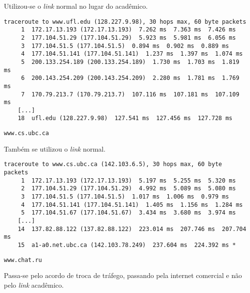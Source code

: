 \begin{parts}
\begin{subparts}
    \begin{solution}
      Utilizou-se o \emph{link} normal no lugar do acadêmico.

    \begin{Verbatim}[label={\$ traceroute www.ufl.edu}, fontsize=\footnotesize]
    traceroute to www.ufl.edu (128.227.9.98), 30 hops max, 60 byte packets
     1  172.17.13.193 (172.17.13.193)  7.262 ms  7.363 ms  7.426 ms
     2  177.104.51.29 (177.104.51.29)  5.923 ms  5.981 ms  6.056 ms
     3  177.104.51.5 (177.104.51.5)  0.894 ms  0.902 ms  0.889 ms
     4  177.104.51.141 (177.104.51.141)  1.237 ms  1.397 ms  1.074 ms
     5  200.133.254.189 (200.133.254.189)  1.730 ms  1.703 ms  1.819 ms
     6  200.143.254.209 (200.143.254.209)  2.280 ms  1.781 ms  1.769 ms
     7  170.79.213.7 (170.79.213.7)  107.116 ms  107.181 ms  107.109 ms
    [...]
    18  ufl.edu (128.227.9.98)  127.541 ms  127.456 ms  127.728 ms
    \end{Verbatim}
    \end{solution}

    \subpart
    \verb|www.cs.ubc.ca|

    \begin{solution}
      Também se utilizou o \emph{link} normal.

    \begin{Verbatim}[label={\$ traceroute www.cs.ubc.ca}, fontsize=\footnotesize]
    traceroute to www.cs.ubc.ca (142.103.6.5), 30 hops max, 60 byte packets
     1  172.17.13.193 (172.17.13.193)  5.197 ms  5.255 ms  5.320 ms
     2  177.104.51.29 (177.104.51.29)  4.992 ms  5.089 ms  5.080 ms
     3  177.104.51.5 (177.104.51.5)  1.017 ms  1.006 ms  0.979 ms
     4  177.104.51.141 (177.104.51.141)  1.405 ms  1.156 ms  1.284 ms
     5  177.104.51.67 (177.104.51.67)  3.434 ms  3.680 ms  3.974 ms
    [...]
    14  137.82.88.122 (137.82.88.122)  223.014 ms  207.746 ms  207.704 ms
    15  a1-a0.net.ubc.ca (142.103.78.249)  237.604 ms  224.392 ms *
    \end{Verbatim}
    \end{solution}

    \subpart
    \verb|www.chat.ru|

    \begin{solution}
      Passa-se pelo acordo de troca de tráfego, passando pela internet
      comercial e não pelo \emph{link} acadêmico.


\end{solution}
\end{subparts}
\end{parts}
